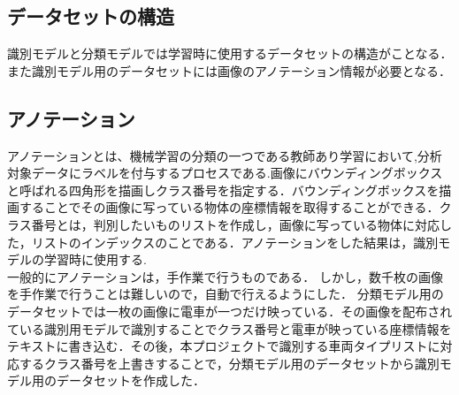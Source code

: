 \subsection{データセットの構造}
識別モデルと分類モデルでは学習時に使用するデータセットの構造がことなる．また識別モデル用のデータセットには画像のアノテーション情報が必要となる．
\subsection{アノテーション}
アノテーションとは、機械学習の分類の一つである教師あり学習において,分析対象データにラベルを付与するプロセスである.画像にバウンディングボックスと呼ばれる四角形を描画しクラス番号を指定する．バウンディングボックスを描画することでその画像に写っている物体の座標情報を取得することができる．クラス番号とは，判別したいものリストを作成し，画像に写っている物体に対応した，リストのインデックスのことである．アノテーションをした結果は，識別モデルの学習時に使用する.\\
一般的にアノテーションは，手作業で行うものである．
しかし，数千枚の画像を手作業で行うことは難しいので，自動で行えるようにした．
分類モデル用のデータセットでは一枚の画像に電車が一つだけ映っている．その画像を配布されている識別用モデルで識別することでクラス番号と電車が映っている座標情報をテキストに書き込む．その後，本プロジェクトで識別する車両タイプリストに対応するクラス番号を上書きすることで，分類モデル用のデータセットから識別モデル用のデータセットを作成した．


